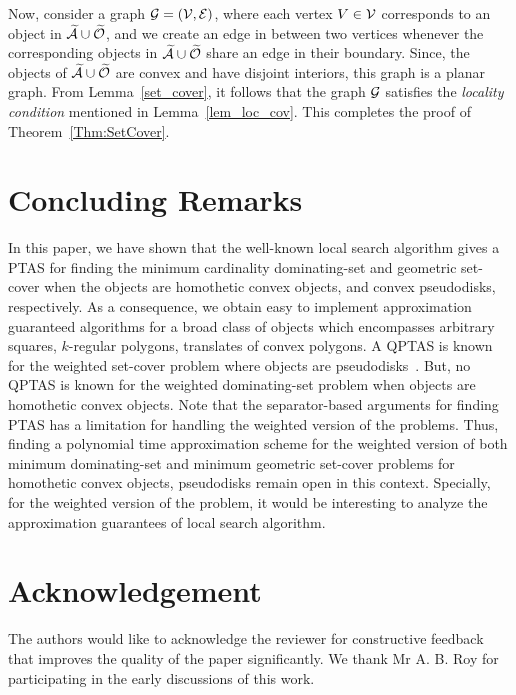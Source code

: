 \documentclass[a4paper,11pt]{article}
\begin{document}
Now,  consider  a graph ${\cal G}=({\cal V},{\cal E})$, where  each vertex 
$V\in {\cal V}$ corresponds to an object in $\widetilde{\cal A}\cup 
\widetilde{\cal O}$,  and we create an edge in between two vertices whenever the corresponding objects in $\widetilde{\cal A}\cup \widetilde{\cal O}$ share an edge in their boundary. 
Since, the objects of $\widetilde{\cal A}\cup \widetilde{\cal O}$ are convex and have disjoint interiors, this graph is a  planar graph.  
From Lemma~\ref{set_cover}, it follows that  the graph ${\cal G}$ satisfies the {\it locality condition} mentioned in  Lemma~\ref{lem_loc_cov}.
This completes the proof of Theorem~\ref{Thm:SetCover}.



\section{Concluding Remarks}
In this paper, we have shown that the well-known local search algorithm gives a PTAS for  finding the minimum cardinality dominating-set and geometric set-cover when the objects are homothetic convex objects, and  convex pseudodisks, respectively. 
As a consequence, we obtain easy to implement approximation guaranteed algorithms for a broad class of objects which encompasses arbitrary squares, $k$-regular polygons,  translates of  convex polygons. 
A QPTAS is known for the weighted set-cover problem where objects are pseudodisks~\cite{Ray}. 
But,  no QPTAS is known for the weighted dominating-set problem when objects are homothetic convex objects.  
Note that the separator-based arguments for finding PTAS has a limitation for handling the weighted version of the problems. 
Thus, finding a polynomial time approximation scheme for the weighted version of both minimum dominating-set and minimum geometric set-cover problems for  homothetic convex objects, pseudodisks remain open in this context. 
Specially, for the weighted version of the problem, it would be interesting to analyze the approximation guarantees of local search algorithm.

\section*{Acknowledgement}
The authors would like to acknowledge the reviewer for constructive feedback that improves the quality of the paper significantly.
We thank Mr A. B. Roy  for participating in the early discussions of this work.
\end{document}
